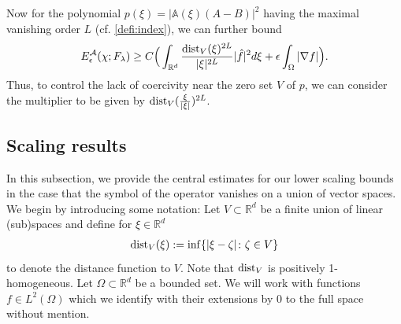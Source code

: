 \documentclass[a4paper, 10pt, twoside, notitlepage]{amsart}
\theoremstyle{plain}
\newcommand{\R}{\mathbb{R}}
\newcommand{\A}{\mathcal{A}}
\renewcommand{\AA}{\mathbb{A}}
\begin{document}
                Now for the polynomial $p(\xi) = |\AA(\xi)(A-B)|^2$ having the maximal vanishing order $L$ (cf. \cref{defi:index}), we can further bound
                \begin{align*}
                  E^{\A}_\epsilon(\chi;F_\lambda) \geq C \Big( \int_{\R^d} \frac{\dist_V(\xi)^{2L}}{|\xi|^{2L}} |\hat{f}|^2 d\xi + \epsilon \int_\Omega |\nabla f| \Big).
                \end{align*}
                Thus, to control the lack of coercivity near the zero set $V$ of $p$, we can consider the multiplier to be given by $\operatorname{dist}_V(\frac{\xi}{|\xi|})^{2L}$.
                

		
		
		\subsection{Scaling results}
		\label{sec:scaling}
		
                In this subsection, we provide the central estimates for our lower scaling bounds in the case that the symbol of the operator vanishes on a union of vector spaces. We begin by introducing some notation:
                Let $V\subset\R^d$ be a finite union of linear (sub)spaces and define for $\xi \in \R^d$
			\begin{align*}
				\operatorname{dist}_V(\xi):=\inf\{|\xi-\zeta|\colon \zeta\in V\}
			\end{align*}
			to denote the distance function to $V$. Note that $\operatorname{dist}_V$ is positively 1-homogeneous. Let $\Omega\subset\R^d$ be a bounded set. We will work with functions $f\in L^2(\Omega)$ which we
		identify with their extensions by $0$ to the full space without mention.
		
\end{document}
